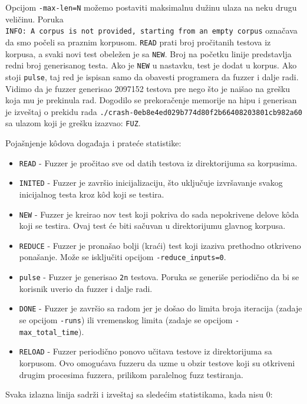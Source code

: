 Opcijom \texttt{-max-len=N} možemo postaviti maksimalnu dužinu ulaza na neku drugu veličinu. Poruka \texttt{INFO:\ A\ corpus\ is\ not\ provided,\ starting\ from\ an\ empty\ corpus} označava da smo počeli sa praznim korpusom. \texttt{READ} prati broj pročitanih testova iz korpusa, a svaki novi test obeležen je sa \texttt{NEW}. Broj na početku linije predstavlja redni broj generisanog testa. Ako je \texttt{NEW} u nastavku, test je dodat u korpus. Ako stoji \texttt{pulse}, taj red je ispisan samo da obavesti programera da fuzzer i dalje radi. Vidimo da je fuzzer generisao 2097152 testova pre nego što je naišao na grešku koja mu je prekinula rad. Dogodilo se prekoračenje memorije na hipu i generisan je izveštaj o prekidu rada \texttt{./crash-0eb8e4ed029b774d80f2b66408203801cb982a60} sa ulazom koji je grešku izazvao: \texttt{FUZ}.

Pojašnjenje kôdova događaja i prateće statistike:

\begin{itemize}
\item
  \texttt{READ} - Fuzzer je pročitao sve od datih testova iz direktorijuma sa korpusima.
\item
  \texttt{INITED} - Fuzzer je završio inicijalizaciju, što uključuje izvršavanje svakog inicijalnog testa kroz kôd koji se testira.
\item
  \texttt{NEW} - Fuzzer je kreirao nov test koji pokriva do sada nepokrivene delove kôda koji se testira. Ovaj test će biti sačuvan u direktorijumu glavnog korpusa.
\item
  \texttt{REDUCE} - Fuzzer je pronašao bolji (kraći) test koji izaziva prethodno otkriveno ponašanje. Može se isključiti opcijom \texttt{-reduce\_inputs=0}.
\item
  \texttt{pulse} - Fuzzer je generisao \texttt{2n} testova. Poruka se generiše periodično da bi se korisnik uverio da fuzzer i dalje radi.
\item
  \texttt{DONE} - Fuzzer je završio sa radom jer je došao do limita broja iteracija (zadaje se opcijom \texttt{-runs}) ili vremenskog limita (zadaje se opcijom \texttt{-max\_total\_time}).
\item
  \texttt{RELOAD} - Fuzzer periodično ponovo učitava testove iz direktorijuma sa korpusom. Ovo omogućava fuzzeru da uzme u obzir testove koji su otkriveni drugim procesima fuzzera, prilikom paralelnog fuzz testiranja.
\end{itemize}

Svaka izlazna linija sadrži i izveštaj sa sledećim statistikama, kada nisu 0:

